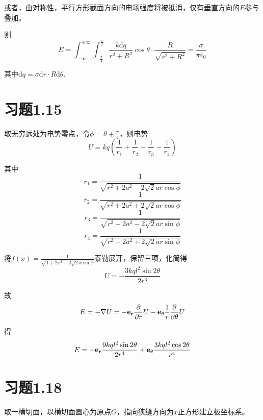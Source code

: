 \documentclass{SCIS2020cn}
\begin{document}
或者，由对称性，平行方形截面方向的电场强度将被抵消，仅有垂直方向的$E$参与叠加。

则
\begin{equation}
    E=\int_{-\infty}^{+\infty}\int_{-\frac{\pi}{2}}^{\frac{\pi}{2}}\frac{k\text{d}q}{r^2+R^2}\cos{\theta}·\frac{R}{\sqrt{r^2+R^2}}=\frac{\sigma}{\pi\varepsilon_0}
\end{equation}

其中$\text{d}q=\sigma\text{d}r·R\text{d}\theta$.

\section{习题1.15}
取无穷远处为电势零点，令$\displaystyle\phi=\theta+\frac{\pi}{4}$，则电势
\begin{equation}
    U=kq\left(\frac{1}{r_1}+\frac{1}{r_2}-\frac{1}{r_3}-\frac{1}{r_4}\right)
\end{equation}

其中
\begin{equation}
    r_1=\frac{1}{\sqrt{r^2+2a^2-2\sqrt{2}ar\cos\phi}}
\end{equation}
\begin{equation}
    r_2=\frac{1}{\sqrt{r^2+2a^2+2\sqrt{2}ar\cos\phi}}
\end{equation}
\begin{equation}
    r_3=\frac{1}{\sqrt{r^2+2a^2-2\sqrt{2}ar\sin\phi}}
\end{equation}
\begin{equation}
    r_4=\frac{1}{\sqrt{r^2+2a^2+2\sqrt{2}ar\sin\phi}}
\end{equation}

将$\displaystyle{}f(x)=\frac{1}{\sqrt{1+2x^2-2\sqrt{2}x\sin\phi}}$泰勒展开，保留三项，化简得
\begin{equation}
    U=-\frac{3kql^2\sin{2\theta}}{2r^3}
\end{equation}

故
\begin{equation}
    E=-\nabla{}U=-\bold{e_r}\frac{\partial}{\partial{}r}U-\bold{e_\theta}\frac{1}{r}\frac{\partial}{\partial{}\theta}U
\end{equation}

得
\begin{equation}
    E=-\bold{e_r}\frac{9kql^2\sin{2\theta}}{2r^4}+\bold{e_\theta}\frac{3kql^2\cos{2\theta}}{r^4}
\end{equation}

\section{习题1.18}
取一横切面，以横切面圆心为原点$O$，指向狭缝方向为$x$正方形建立极坐标系。
\end{document}
